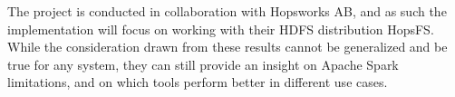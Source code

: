 The project is conducted in collaboration with Hopsworks AB, and as such the implementation will focus on working with their \gls{HDFS} distribution HopsFS. While the consideration drawn from these results cannot be generalized and be true for any system, they can still provide an insight on Apache Spark limitations, and on which tools perform better in different use cases. 